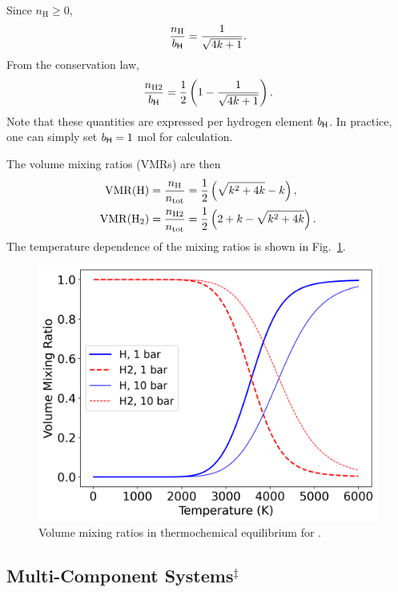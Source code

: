 Since $n_\mathrm{H} \ge 0$,
\begin{align}
 \frac{n_\mathrm{H}}{ b_{\mathsf{H}} } = \frac{1}{\sqrt{4 k + 1}}.
\end{align}
From the conservation law,
\begin{align}
 \frac{n_\mathrm{H2}}{ b_{\mathsf{H}} } = \frac{1}{2} \left( 1 - \frac{1}{\sqrt{4 k + 1}} \right).
\end{align}
Note that these quantities are expressed per hydrogen element $b_{\mathsf{H}}$. In practice, one can simply set $b_{\mathsf{H}} = 1$ mol for calculation.

The volume mixing ratios (VMRs) are then
\begin{align}
 \mathrm{VMR} (\ce{H}) &= \frac{n_\mathrm{H}}{n_\mathrm{tot}} = \frac{1}{2} \left( \sqrt{k^2 + 4 k} - k \right), \\
  \mathrm{VMR} (\ce{H2}) &= \frac{n_\mathrm{H2}}{n_\mathrm{tot}} = \frac{1}{2} \left( 2 + k - \sqrt{k^2 + 4 k}\right).
\end{align}
The temperature dependence of the mixing ratios is shown in Fig.~\ref{fig:temperature_exogibbs}. \\

\begin{figure}
    \centering
    \includegraphics[width=\linewidth]{fig/tce_two_species.png}
    \caption{Volume mixing ratios in thermochemical equilibrium for .}
    \label{fig:temperature_exogibbs}
\end{figure}

\subsection*{Multi-Component Systems$^\ddagger$}

